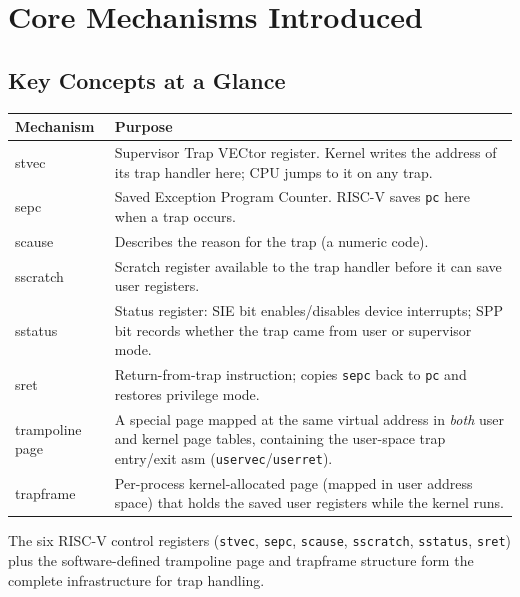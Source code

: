 \documentclass[11pt, a4paper]{article}
\begin{document}
\section{Core Mechanisms Introduced}

\subsection{Key Concepts at a Glance}

\begin{center}
\begin{tabular}{@{}>{\ttfamily}lp{10cm}@{}}
\toprule
\textbf{Mechanism}   & \textbf{Purpose} \\
\midrule
stvec              & Supervisor Trap VECtor register. Kernel writes the address of its trap handler here; CPU jumps to it on any trap. \\
sepc               & Saved Exception Program Counter. RISC-V saves \lstinline|pc| here when a trap occurs. \\
scause             & Describes the reason for the trap (a numeric code). \\
sscratch           & Scratch register available to the trap handler before it can save user registers. \\
sstatus            & Status register: SIE bit enables/disables device interrupts; SPP bit records whether the trap came from user or supervisor mode. \\
sret               & Return-from-trap instruction; copies \lstinline|sepc| back to \lstinline|pc| and restores privilege mode. \\
\midrule
trampoline page    & A special page mapped at the same virtual address in \emph{both} user and kernel page tables, containing the user-space trap entry/exit asm (\lstinline|uservec|/\lstinline|userret|). \\
trapframe          & Per-process kernel-allocated page (mapped in user address space) that holds the saved user registers while the kernel runs. \\
\bottomrule
\end{tabular}
\end{center}

\begin{tcolorbox}[summary, title={Section Summary}]
The six RISC-V control registers (\lstinline|stvec|, \lstinline|sepc|, \lstinline|scause|, \lstinline|sscratch|, \lstinline|sstatus|, \lstinline|sret|) plus the software-defined trampoline page and trapframe structure form the complete infrastructure for trap handling.
\end{tcolorbox}
\end{document}
